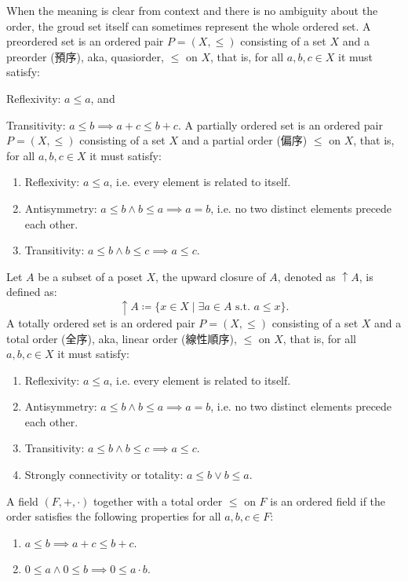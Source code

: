 \documentclass[a4paper,12pt]{article}
\begin{document}
When the meaning is clear from context and there is no ambiguity about the order, the groud set itself can sometimes represent the whole ordered set.
A preordered set is an ordered pair $P=(X,\leq )$ consisting of a set $X$ and a preorder (預序), aka, quasiorder, $\leq$ on $X$, that is, for all $a,b,c\in X$ it must satisfy:
\bit
\item Reflexivity: $a\leq a$, and
\item Transitivity: $a\leq b\implies a+c\leq b+c$.
\eit
{}
A partially ordered set is an ordered pair $P=(X,\leq )$ consisting of a set $X$ and a partial order (偏序) $\leq$ on $X$, that is, for all $a,b,c\in X$ it must satisfy:
\begin{enumerate}
\item Reflexivity: $a\leq a$, i.e. every element is related to itself.
\item Antisymmetry: $a\leq b\land b\leq a\implies a=b$, i.e. no two distinct elements precede each other.
\item Transitivity: $a\leq b\land b\leq c\implies a\leq c$.
\end{enumerate}
Let $A$ be a subset of a poset $X$, the upward closure of $A$, denoted as $\uparrow A$, is defined as:
\[\uparrow A \coloneq \{ x \in X \mid\exists a \in A \text{\ s.t.\ } a \leq x \}.\]
A totally ordered set is an ordered pair $P=(X,\leq )$ consisting of a set $X$ and a total order (全序), aka, linear order (線性順序), $\leq$ on $X$, that is, for all $a,b,c\in X$ it must satisfy:
\begin{enumerate}
\item Reflexivity: $a\leq a$, i.e. every element is related to itself.
\item Antisymmetry: $a\leq b\land b\leq a\implies a=b$, i.e. no two distinct elements precede each other.
\item Transitivity: $a\leq b\land b\leq c\implies a\leq c$.
\item Strongly connectivity or totality: $a\leq b\lor b\leq a$.
\end{enumerate}
A field $(F,+,\cdot)$ together with a total order $\leq$ on $F$ is an ordered field if the order satisfies the following properties for all $a,b,c\in F$:
\begin{enumerate}
\item $a\leq b\implies a+c\leq b+c$.
\item $0\leq a\land 0\leq b\implies 0\leq a\cdot b$.
\end{enumerate}
\end{document}
